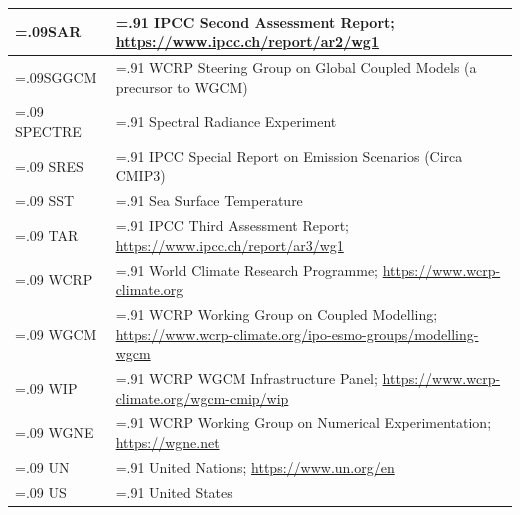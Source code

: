 \documentclass[gmd, preprint]{copernicus}
\begin{document}
\begin{table}[htp]
{\begin{tabularx}{1\textwidth} { 
	  | >{\raggedright\arraybackslash\hsize=.09\hsize}X
	  | >{\centering\arraybackslash\hsize=.91\hsize}X | }
\hline
SAR & IPCC Second Assessment Report; \url{https://www.ipcc.ch/report/ar2/wg1} \\
\hline
SGGCM & WCRP Steering Group on Global Coupled Models (a precursor to WGCM) \\
\hline
SPECTRE & Spectral Radiance Experiment \\
\hline
SRES & IPCC Special Report on Emission Scenarios (Circa CMIP3) \\
\hline
SST & Sea Surface Temperature \\
\hline
TAR & IPCC Third Assessment Report; \url{https://www.ipcc.ch/report/ar3/wg1} \\
\hline
WCRP & World Climate Research Programme; \url{https://www.wcrp-climate.org} \\
\hline
WGCM & WCRP Working Group on Coupled Modelling; \url{https://www.wcrp-climate.org/ipo-esmo-groups/modelling-wgcm} \\
\hline
WIP & WCRP WGCM Infrastructure Panel; \url{https://www.wcrp-climate.org/wgcm-cmip/wip} \\
\hline
WGNE & WCRP Working Group on Numerical Experimentation; \url{https://wgne.net} \\
\hline
UN & United Nations; \url{https://www.un.org/en} \\
\hline
US & United States \\
\hline
\end{tabularx}
} %
\label{tab:tabAppE1-Acronyms}
\footnotesize{}
\end{table}


\noappendix       %




\appendixfigures  %
\end{document}
